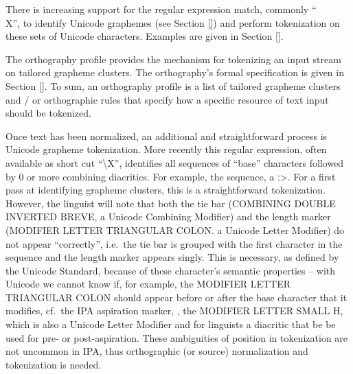 There is increasing support for the regular expression match, commonly ``\\X'',
to identify Unicode graphemes (see Section \ref{}) and perform tokenization on
these sets of Unicode characters. Examples are given in Section \ref{}.

The orthography profile provides the mechanism for tokenizing an input stream on
tailored grapheme clusters. The orthography's formal specification is given in
Section \ref{}. To sum, an orthography profile is a list of tailored grapheme
clusters and / or orthographic rules that specify how a specific resource of
text input should be tokenized. 

Once text has been normalized, an additional and straightforward process is
Unicode grapheme tokenization. More recently this regular expression, often
available as short cut ``\textbackslash{X}'', identifies all sequences of
``base'' characters followed by 0 or more combining diacritics. For example, the
sequence, %
a ː>. For a first pass at identifying grapheme clusters, this is a
straightforward tokenization. However, the linguist will note that both the tie
bar (COMBINING DOUBLE INVERTED BREVE, a Unicode Combining Modifier) and the
length marker (MODIFIER LETTER TRIANGULAR COLON. a Unicode Letter Modifier) do
not appear ``correctly'', i.e.~the tie bar is grouped with the first character
in the sequence and the length marker appears singly. This is necessary, as
defined by the Unicode Standard, because of these character's semantic
properties -- with Unicode we cannot know if, for example, the MODIFIER LETTER
TRIANGULAR COLON should appear before or after the base character that it
modifies, cf.~the IPA aspiration marker, , the MODIFIER LETTER SMALL H, which is
also a Unicode Letter Modifier and for linguists a diacritic that be be used for
pre- or post-aspiration. These ambiguities of position in tokenization are not
uncommon in IPA, thus orthographic (or source) normalization and tokenization is
needed.

